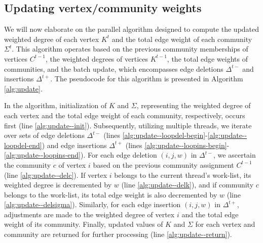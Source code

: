 \subsection{Updating vertex/community weights}
\label{sec:our-update}

We will now elaborate on the parallel algorithm designed to compute the updated weighted degree of each vertex $K^t$ and the total edge weight of each community $\Sigma^t$. This algorithm operates based on the previous community memberships of vertices $C^{t-1}$, the weighted degrees of vertices $K^{t-1}$, the total edge weights of communities, and the batch update, which encompasses edge deletions $\Delta^{t-}$ and insertions $\Delta^{t+}$. The pseudocode for this algorithm is presented in Algorithm \ref{alg:update}.

In the algorithm, initialization of $K$ and $\Sigma$, representing the weighted degree of each vertex and the total edge weight of each community, respectively, occurs first (line \ref{alg:update--init}). Subsequently, utilizing multiple threads, we iterate over sets of edge deletions $\Delta^{t-}$ (lines \ref{alg:update--loopdel-begin}-\ref{alg:update--loopdel-end}) and edge insertions $\Delta^{t+}$ (lines \ref{alg:update--loopins-begin}-\ref{alg:update--loopins-end}). For each edge deletion $(i, j, w)$ in $\Delta^{t-}$, we ascertain the community $c$ of vertex $i$ based on the previous community assignment $C^{t-1}$ (line \ref{alg:update--delc}). If vertex $i$ belongs to the current thread's work-list, its weighted degree is decremented by $w$ (line \ref{alg:update--delk}), and if community $c$ belongs to the work-list, its total edge weight is also decremented by $w$ (line \ref{alg:update--delsigma}). Similarly, for each edge insertion $(i, j, w)$ in $\Delta^{t+}$, adjustments are made to the weighted degree of vertex $i$ and the total edge weight of its community. Finally, updated values of $K$ and $\Sigma$ for each vertex and community are returned for further processing (line \ref{alg:update--return}).


